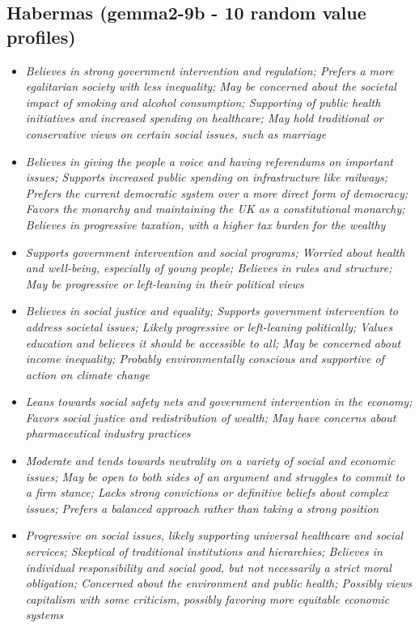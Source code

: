 \documentclass[11pt]{article}
\newcommand{\profiletext}[1]{\textit{#1}}
\begin{document}
\subsection{Habermas (gemma2-9b - 10 random value profiles)}
\begin{itemize}
\item \profiletext{Believes in strong government intervention and regulation; Prefers a more egalitarian society with less inequality; May be concerned about the societal impact of smoking and alcohol consumption; Supporting of public health initiatives and increased spending on healthcare; May hold traditional or conservative views on certain social issues, such as marriage}
\item \profiletext{Believes in giving the people a voice and having referendums on important issues; Supports increased public spending on infrastructure like railways; Prefers the current democratic system over a more direct form of democracy; Favors the monarchy and maintaining the UK as a constitutional monarchy; Believes in progressive taxation, with a higher tax burden for the wealthy}
\item \profiletext{Supports government intervention and social programs; Worried about health and well-being, especially of young people; Believes in rules and structure; May be progressive or left-leaning in their political views}
\item \profiletext{Believes in social justice and equality; Supports government intervention to address societal issues; Likely progressive or left-leaning politically; Values education and believes it should be accessible to all; May be concerned about income inequality; Probably environmentally conscious and supportive of action on climate change}
\item \profiletext{Leans towards social safety nets and government intervention in the economy; Favors social justice and redistribution of wealth; May have concerns about pharmaceutical industry practices}
\item \profiletext{Moderate and tends towards neutrality on a variety of social and economic issues; May be open to both sides of an argument and struggles to commit to a firm stance; Lacks strong convictions or definitive beliefs about complex issues; Prefers a balanced approach rather than taking a strong position}
\item \profiletext{Progressive on social issues, likely supporting universal healthcare and social services; Skeptical of traditional institutions and hierarchies; Believes in individual responsibility and social good, but not necessarily a strict moral obligation; Concerned about the environment and public health; Possibly views capitalism with some criticism, possibly favoring more equitable economic systems}

\end{itemize}
\end{document}
